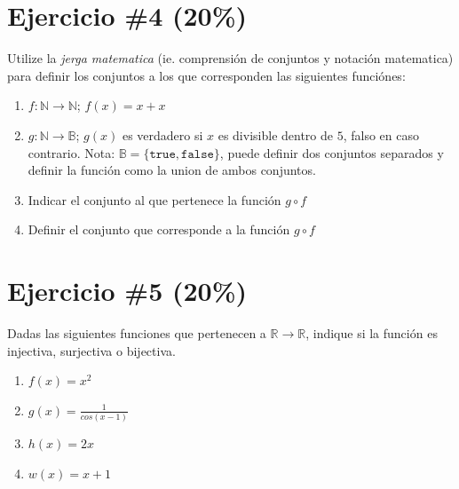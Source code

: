 \documentclass{article}
\begin{document}
\section*{Ejercicio \#4 (20\%)}
Utilize la \emph{jerga matematica} (ie. comprensi\'on de conjuntos y notaci\'on matematica) para definir los conjuntos a los que corresponden las
siguientes funci\'ones:
\begin{enumerate}
        \item{$f:\mathbb{N}\rightarrow\mathbb{N}$; $f(x)=x+x$}
        \item{$g:\mathbb{N}\rightarrow\mathbb{B}$; $g(x)$ es verdadero si
        $x$ es divisible dentro de $5$, falso en caso contrario. Nota: $\mathbb{B}=
        \{\mathtt{true},\mathtt{false}\}$, puede definir dos conjuntos separados y
        definir la funci\'on como la union de ambos conjuntos.}
        \item{Indicar el conjunto al que pertenece la funci\'on $g\circ f$}
        \item{Definir el conjunto que corresponde a la funci\'on $g\circ f$}
\end{enumerate}

\section*{Ejercicio \#5 (20\%)}
Dadas las siguientes funciones que pertenecen a $\mathbb{R}\rightarrow \mathbb{R}$, indique
si la funci\'on es injectiva, surjectiva o bijectiva.
\begin{enumerate}
        \item{$f(x)=x^2$}
        \item{$g(x)=\frac{1}{cos(x-1)}$}
        \item{$h(x)=2x$}
        \item{$w(x)=x+1$}
\end{enumerate}
\end{document}
